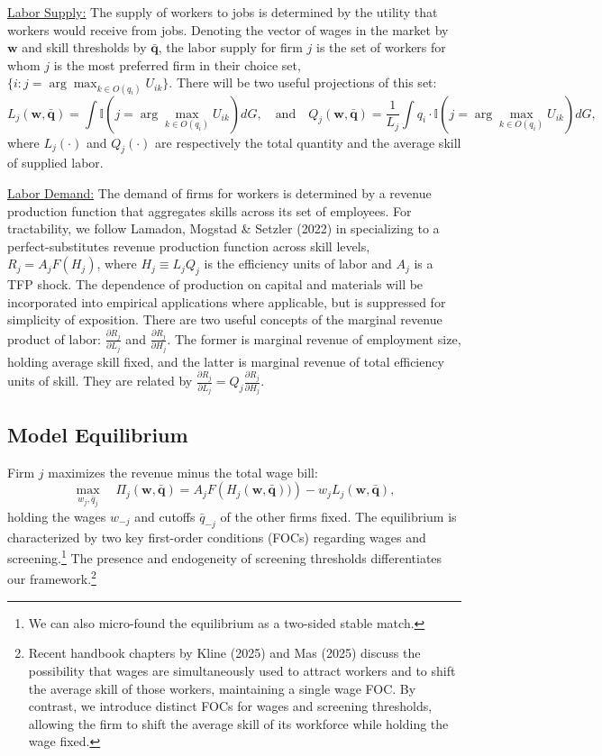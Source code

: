 \documentclass[11pt]{article}
\begin{document}
\underline{Labor Supply:} The supply of workers to jobs is determined by the utility that workers would receive from jobs.  Denoting the vector of wages in the market by $\mathbf{w}$ and skill thresholds by $\mathbf{\bar{q}}$, the labor supply for firm $j$ is the set of workers for whom $j$ is the most preferred firm in their choice set, $\{i: j = \arg\max_{k \in O(q_i)} U_{ik} \}$. There will be two useful projections of this set:
$$
L_j(\mathbf{w}, \mathbf{\bar{q}}) = \int \mathbb{I}\left(j = \arg\max_{k \in O(q_i)} U_{ik} \right) dG, \quad \text{and} \quad 
Q_j(\mathbf{w}, \mathbf{\bar{q}}) = \frac{1}{L_j} \int q_i \cdot \mathbb{I}\left(j = \arg\max_{k \in O(q_i)} U_{ik} \right) dG,
$$
where $L_j(\cdot)$ and $Q_j(\cdot)$ are respectively the total quantity and the average skill of supplied labor.

\underline{Labor Demand:} The demand of firms for workers is determined by a revenue production function that aggregates skills across its set of employees. For tractability, we follow Lamadon, Mogstad \& Setzler (2022) in specializing to a perfect-substitutes revenue production function across skill levels, $R_j = A_j F(H_j)$, where $H_j \equiv L_j Q_j$ is the efficiency units of labor and $A_j$ is a TFP shock. The dependence of production on capital and materials will be incorporated into empirical applications where applicable, but is suppressed for simplicity of exposition. There are two useful concepts of the marginal revenue product of labor:  
$\frac{\partial R_j}{\partial L_j}$  and $\frac{\partial R_j}{\partial H_j}$. 
The former is marginal revenue of employment size, holding average skill fixed, and the latter is marginal revenue of total efficiency units of skill. They are related by  $ \frac{\partial R_j}{\partial L_j} = Q_j \frac{\partial R_j}{\partial H_j}$.

\subsection{Model Equilibrium}
 

Firm $j$ maximizes the revenue minus the total wage bill:
$$
\max_{w_j, \bar{q}_j} \quad \Pi_j(\mathbf{w}, \mathbf{\bar{q}}) = A_j F \left( H_j(\mathbf{w}, \mathbf{\bar{q}}) ) \right) - w_j L_j(\mathbf{w}, \mathbf{\bar{q}}),
$$
holding the wages $w_{-j}$ and cutoffs $\bar q_{-j}$ of the other firms fixed. The equilibrium is characterized by two key first-order conditions (FOCs) regarding wages and screening.\footnote{We can also micro-found the equilibrium as a two-sided stable match.} The presence and endogeneity of screening thresholds differentiates our framework.\footnote{Recent handbook chapters by Kline (2025) and Mas (2025) discuss the possibility that wages are simultaneously used to attract workers and to shift the average skill of those workers, maintaining a single wage FOC. By contrast, we introduce distinct FOCs for wages and screening thresholds, allowing the firm to shift the  average skill of its workforce while holding the wage fixed.} 
\end{document}
